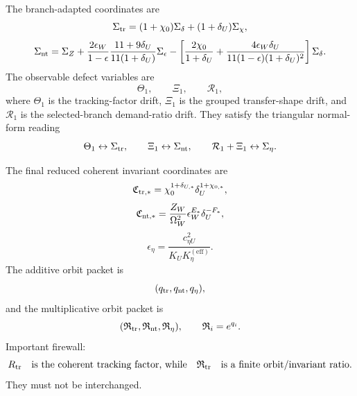 The branch-adapted coordinates are
\begin{equation}
  \Sigma_{\rm tr}=(1+\chi_0)\Sigma_\delta+(1+\delta_U)\Sigma_\chi,
\end{equation}
\begin{equation}
  \Sigma_{\rm nt}
  =
  \Sigma_Z
  +
  \frac{2\epsilon_W}{1-\epsilon}\frac{11+9\delta_U}{11(1+\delta_U)}\Sigma_\epsilon
  -
  \left[
  \frac{2\chi_0}{1+\delta_U}
  +
  \frac{4\epsilon_W\delta_U}{11(1-\epsilon)(1+\delta_U)^2}
  \right]\Sigma_\delta.
\end{equation}
The observable defect variables are
\begin{equation}
  \Theta_1,
  \qquad
  \Xi_1,
  \qquad
  \mathcal R_1,
\end{equation}
where \(\Theta_1\) is the tracking-factor drift, \(\Xi_1\) is the grouped transfer-shape drift, and \(\mathcal R_1\) is the selected-branch demand-ratio drift.  They satisfy the triangular normal-form reading
\begin{equation}
  \Theta_1\leftrightarrow\Sigma_{\rm tr},
  \qquad
  \Xi_1\leftrightarrow\Sigma_{\rm nt},
  \qquad
  \mathcal R_1+\Xi_1\leftrightarrow\Sigma_\eta.
\end{equation}

The final reduced coherent invariant coordinates are
\begin{equation}
  \mathfrak C_{{\rm tr},*}
  =
  \chi_0^{1+\delta_{U,*}}\delta_U^{1+\chi_{0,*}},
\end{equation}
\begin{equation}
  \mathfrak C_{{\rm nt},*}
  =
  \frac{Z_W}{\Omega_W^2}\epsilon_W^{E_*}\delta_U^{-F_*},
\end{equation}
\begin{equation}
  \epsilon_\eta=\frac{c_{\eta U}^2}{K_UK_\eta^{(\mathrm{eff})}}.
\end{equation}
The additive orbit packet is
\begin{equation}
  (q_{\rm tr},q_{\rm nt},q_\eta),
\end{equation}
and the multiplicative orbit packet is
\begin{equation}
  (\mathfrak R_{\rm tr},\mathfrak R_{\rm nt},\mathfrak R_\eta),
  \qquad
  \mathfrak R_i=e^{q_i}.
\end{equation}
Important firewall:
\begin{equation}
  R_{\rm tr}
  \quad\text{is the coherent tracking factor, while}\quad
  \mathfrak R_{\rm tr}
  \quad\text{is a finite orbit/invariant ratio.}
\end{equation}
They must not be interchanged.

